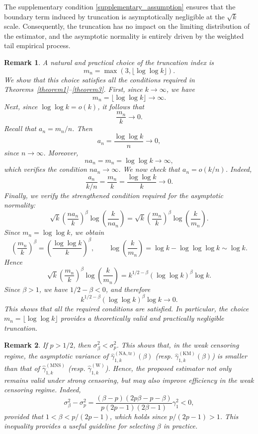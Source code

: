\documentclass[reqno,openbib,runningheads,a4paper,12pt]{amsart}%
\newtheorem{remark}{Remark}[section]
\begin{document}
\noindent The supplementary condition \eqref{supplementary_assumption} ensures
that the boundary term induced by truncation is asymptotically negligible at
the $\sqrt{k}$ scale. Consequently, the truncation has no impact on the
limiting distribution of the estimator, and the asymptotic normality is
entirely driven by the weighted tail empirical process.

\begin{remark}
A natural and practical choice of the truncation index is
\[
m_{n}=\max\left(  3,\lfloor\log\log k\rfloor\right)  .
\]
We show that this choice satisfies all the conditions required in
Theorems~\ref{theorem1}--\ref{theorem3}. First, since $k\rightarrow\infty$, we
have
\[
m_{n}=\lfloor\log\log k\rfloor\longrightarrow\infty.
\]
Next, since $\log\log k=o(k)$, it follows that
\[
\frac{m_{n}}{k}\longrightarrow0.
\]
Recall that $a_{n}=m_{n}/n$. Then
\[
a_{n}=\frac{\log\log k}{n}\longrightarrow0,
\]
since $n\rightarrow\infty$. Moreover,
\[
na_{n}=m_{n}=\log\log k\longrightarrow\infty,
\]
which verifies the condition $na_{n}\rightarrow\infty$. We now check that
$a_{n}=o(k/n)$. Indeed,
\[
\frac{a_{n}}{k/n}=\frac{m_{n}}{k}=\frac{\log\log k}{k}\longrightarrow0.
\]
Finally, we verify the strengthened condition required for the asymptotic
normality:
\[
\sqrt{k}\left(  \frac{na_{n}}{k}\right)  ^{\beta}\log\!\left(  \frac{k}%
{na_{n}}\right)  =\sqrt{k}\left(  \frac{m_{n}}{k}\right)  ^{\beta}%
\log\!\left(  \frac{k}{m_{n}}\right)  .
\]
Since $m_{n}=\log\log k$, we obtain
\[
\left(  \frac{m_{n}}{k}\right)  ^{\beta}=\left(  \frac{\log\log k}{k}\right)
^{\beta},\qquad\log\!\left(  \frac{k}{m_{n}}\right)  =\log k-\log\log\log
k\sim\log k.
\]
Hence
\[
\sqrt{k}\left(  \frac{m_{n}}{k}\right)  ^{\beta}\log\!\left(  \frac{k}{m_{n}%
}\right)  =k^{1/2-\beta}(\log\log k)^{\beta}\log k.
\]
Since $\beta>1$, we have $1/2-\beta<0$, and therefore
\[
k^{1/2-\beta}(\log\log k)^{\beta}\log k\longrightarrow0.
\]
This shows that all the required conditions are satisfied. In particular, the
choice $m_{n}=\lfloor\log\log k\rfloor$ provides a theoretically valid and
practically negligible truncation.
\end{remark}

\begin{remark}
If $p>1/2$, then $\sigma_{\beta}^{2}<\sigma_{p}^{2}$. This shows that, in the
weak censoring regime, the asymptotic variance of $\widehat{\gamma}
_{1,k}^{(\mathrm{NA,tr})}(\beta)$ (resp. $\widehat{\gamma}_{1,k}
^{(\mathrm{KM})}(\beta)$) is smaller than that of $\widehat{\gamma}
_{1,k}^{(\mathrm{MNS})}$ (resp. $\widehat{\gamma}_{1,k}^{(\mathrm{W})}$).
Hence, the proposed estimator not only remains valid under strong censoring,
but may also improve efficiency in the weak censoring regime. Indeed,
\[
\sigma_{\beta}^{2}-\sigma_{p}^{2}=\frac{(\beta-p)(2p\beta-p-\beta
)}{p(2p-1)(2\beta-1)}\gamma_{1}^{2}<0,
\]
provided that $1<\beta<p/(2p-1)$, which holds since $p/(2p-1)>1$. This
inequality provides a useful guideline for selecting $\beta$ in practice.
\end{remark}
\end{document}
